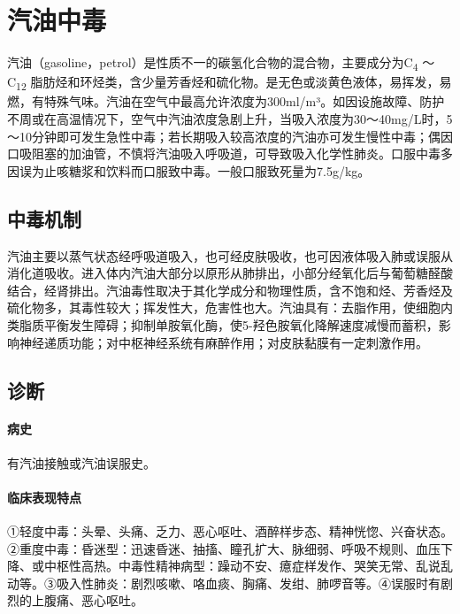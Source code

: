 \protect\hypertarget{text00154.html}{}{}

\section{汽油中毒}

汽油（gasoline，petrol）是性质不一的碳氢化合物的混合物，主要成分为C\textsubscript{4}
～C\textsubscript{12}
脂肪烃和环烃类，含少量芳香烃和硫化物。是无色或淡黄色液体，易挥发，易燃，有特殊气味。汽油在空气中最高允许浓度为300ml/m³。如因设施故障、防护不周或在高温情况下，空气中汽油浓度急剧上升，当吸入浓度为30～40mg/L时，5～10分钟即可发生急性中毒；若长期吸入较高浓度的汽油亦可发生慢性中毒；偶因口吸阻塞的加油管，不慎将汽油吸入呼吸道，可导致吸入化学性肺炎。口服中毒多因误为止咳糖浆和饮料而口服致中毒。一般口服致死量为7.5g/kg。

\subsection{中毒机制}

汽油主要以蒸气状态经呼吸道吸入，也可经皮肤吸收，也可因液体吸入肺或误服从消化道吸收。进入体内汽油大部分以原形从肺排出，小部分经氧化后与葡萄糖醛酸结合，经肾排出。汽油毒性取决于其化学成分和物理性质，含不饱和烃、芳香烃及硫化物多，其毒性较大；挥发性大，危害性也大。汽油具有：去脂作用，使细胞内类脂质平衡发生障碍；抑制单胺氧化酶，使5-羟色胺氧化降解速度减慢而蓄积，影响神经递质功能；对中枢神经系统有麻醉作用；对皮肤黏膜有一定刺激作用。

\subsection{诊断}

\paragraph{病史}

有汽油接触或汽油误服史。

\paragraph{临床表现特点}

①轻度中毒：头晕、头痛、乏力、恶心呕吐、酒醉样步态、精神恍惚、兴奋状态。②重度中毒：昏迷型：迅速昏迷、抽搐、瞳孔扩大、脉细弱、呼吸不规则、血压下降、或中枢性高热。中毒性精神病型：躁动不安、癔症样发作、哭笑无常、乱说乱动等。③吸入性肺炎：剧烈咳嗽、咯血痰、胸痛、发绀、肺啰音等。④误服时有剧烈的上腹痛、恶心呕吐。

